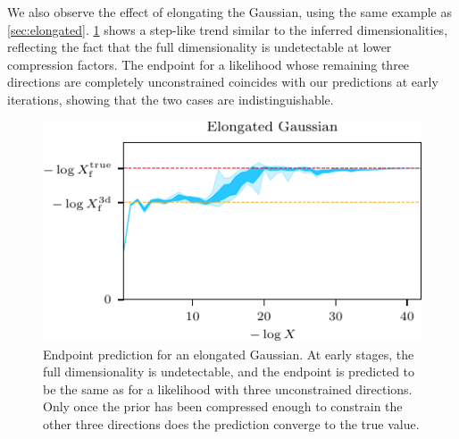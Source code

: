 \documentclass[usenatbib]{mnras}
\begin{document}
We also observe the effect of elongating the Gaussian, using the same example as \cref{sec:elongated}. \cref{fig:elongated_logXfs} shows a step-like trend similar to the inferred dimensionalities, reflecting the fact that the full dimensionality is undetectable at lower compression factors. The endpoint for a likelihood whose remaining three directions are completely unconstrained coincides with our predictions at early iterations, showing that the two cases are indistinguishable. 
\begin{figure}
\begin{center}
    \includegraphics{figures/elongated_logXfs}
\end{center}
\caption{Endpoint prediction for an elongated Gaussian. At early stages, the full dimensionality is undetectable, and the endpoint is predicted to be the same as for a likelihood with three unconstrained directions. Only once the prior has been compressed enough to constrain the other three directions does the prediction converge to the true value.}
\label{fig:elongated_logXfs}
\end{figure}
\end{document}
